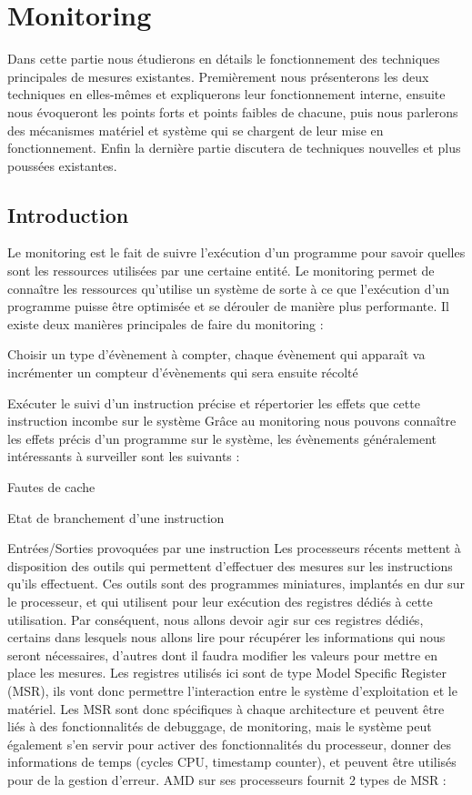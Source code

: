 \chapter{Monitoring}
	Dans cette partie nous étudierons en détails le fonctionnement des techniques principales de mesures existantes. Premièrement nous présenterons les deux techniques en elles-mêmes et expliquerons leur fonctionnement interne, ensuite nous évoqueront les points forts et points faibles de chacune, puis nous parlerons des mécanismes matériel et système qui se chargent de leur mise en fonctionnement. Enfin la dernière partie discutera de techniques nouvelles et plus poussées existantes.
	\section{Introduction}
		Le monitoring est le fait de suivre l'exécution d'un programme pour savoir quelles sont les ressources utilisées par une certaine entité. Le monitoring permet de connaître les ressources qu'utilise un système de sorte à ce que l'exécution d'un programme puisse être optimisée et se dérouler de manière plus performante. Il existe deux manières principales de faire du monitoring : 
		\benum
			\item{Choisir un type d'évènement à compter, chaque évènement qui apparaît va incrémenter un compteur d'évènements qui sera ensuite récolté}
			\item{Exécuter le suivi d'un instruction précise et répertorier les effets que cette instruction incombe sur le système}
		\eenum
		Grâce au monitoring nous pouvons connaître les effets précis d'un programme sur le système, les évènements généralement intéressants à surveiller sont les suivants :
		\benum
			\item{Fautes de cache}
			\item{Etat de branchement d'une instruction}
			\item{Entrées/Sorties provoquées par une instruction}
		\eenum
		Les processeurs récents mettent à disposition des outils qui permettent d'effectuer des mesures sur les instructions qu'ils effectuent. Ces outils sont des programmes miniatures, implantés en dur sur le processeur, et qui utilisent pour leur exécution des registres dédiés à cette utilisation. Par conséquent, nous allons devoir agir sur ces registres dédiés, certains dans lesquels nous allons lire pour récupérer les informations qui nous seront nécessaires, d'autres dont il faudra modifier les valeurs pour mettre en place les mesures. Les registres utilisés ici sont de type Model Specific Register (MSR), ils vont donc permettre l'interaction entre le système d'exploitation et le matériel. Les MSR sont donc spécifiques à chaque architecture et peuvent être liés à des fonctionnalités de debuggage, de monitoring, mais le système peut également s'en servir pour activer des fonctionnalités du processeur, donner des informations de temps (cycles CPU, timestamp counter), et peuvent être utilisés pour de la gestion d'erreur. AMD sur ses processeurs fournit 2 types de MSR : 
